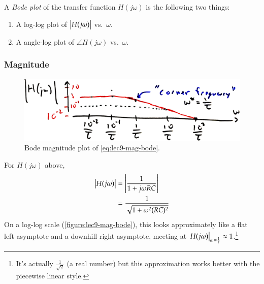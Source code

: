 A \emph{Bode plot} of the transfer function \(H(j\omega)\) is the following two things:
\begin{enumerate}
  \item A log-log plot of \(\abs{H(j\omega)}\) vs.\ \(\omega\).
  \item A angle-log plot of \(\angle H(j\omega)\) vs.\ \(\omega\).
\end{enumerate}

\subsubsection{Magnitude}
\begin{figure}
  \centering
  \includegraphics[width=0.7\linewidth]{figures/9/magnitude-bode}
  \caption{Bode magnitude plot of \autoref{eq:lec9-mag-bode}.}
  \label{figure:lec9-mag-bode}
\end{figure}
For \(H(j\omega)\) above,
\begin{align}
  \abs{H(j\omega)}
  &= \abs{ \frac{1}{1 + j\omega RC} } \\
  &= \frac{1}{\sqrt{1 + \omega^2 (RC)^2}}
\end{align}
On a log-log scale (\autoref{figure:lec9-mag-bode}), this looks approximately like a flat left asymptote and a downhill right asymptote, meeting at \(\eval{H(j\omega)}_{\omega = \frac{1}{\tau}} \approx 1\).\footnote{It's actually \(\frac{1}{\sqrt 2}\) (a real number) but this approximation works better with the piecewise linear style.}

